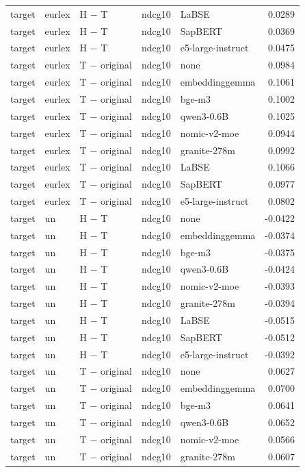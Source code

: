 \begin{tabular}{lllllr}
target & eurlex & H − T & ndcg10 & LaBSE & 0.0289 \\
target & eurlex & H − T & ndcg10 & SapBERT & 0.0369 \\
target & eurlex & H − T & ndcg10 & e5-large-instruct & 0.0475 \\
target & eurlex & T − original & ndcg10 & none & 0.0984 \\
target & eurlex & T − original & ndcg10 & embeddinggemma & 0.1061 \\
target & eurlex & T − original & ndcg10 & bge-m3 & 0.1002 \\
target & eurlex & T − original & ndcg10 & qwen3-0.6B & 0.1025 \\
target & eurlex & T − original & ndcg10 & nomic-v2-moe & 0.0944 \\
target & eurlex & T − original & ndcg10 & granite-278m & 0.0992 \\
target & eurlex & T − original & ndcg10 & LaBSE & 0.1066 \\
target & eurlex & T − original & ndcg10 & SapBERT & 0.0977 \\
target & eurlex & T − original & ndcg10 & e5-large-instruct & 0.0802 \\
target & un & H − T & ndcg10 & none & -0.0422 \\
target & un & H − T & ndcg10 & embeddinggemma & -0.0374 \\
target & un & H − T & ndcg10 & bge-m3 & -0.0375 \\
target & un & H − T & ndcg10 & qwen3-0.6B & -0.0424 \\
target & un & H − T & ndcg10 & nomic-v2-moe & -0.0393 \\
target & un & H − T & ndcg10 & granite-278m & -0.0394 \\
target & un & H − T & ndcg10 & LaBSE & -0.0515 \\
target & un & H − T & ndcg10 & SapBERT & -0.0512 \\
target & un & H − T & ndcg10 & e5-large-instruct & -0.0392 \\
target & un & T − original & ndcg10 & none & 0.0627 \\
target & un & T − original & ndcg10 & embeddinggemma & 0.0700 \\
target & un & T − original & ndcg10 & bge-m3 & 0.0641 \\
target & un & T − original & ndcg10 & qwen3-0.6B & 0.0652 \\
target & un & T − original & ndcg10 & nomic-v2-moe & 0.0566 \\
target & un & T − original & ndcg10 & granite-278m & 0.0607 \\

\end{tabular}

